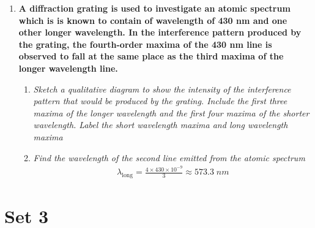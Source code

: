 \documentclass{report}
\begin{document}
\begin{enumerate}
			\item \textbf{A diffraction grating is used to investigate an atomic spectrum which is is known to contain of wavelength of 430 nm and one other longer wavelength. In the interference pattern produced by the grating, the fourth-order maxima of the 430 nm line is observed to fall at the same place as the third maxima of the longer wavelength line.}

				\begin{enumerate}
					\item \textit{Sketch a qualitative diagram to show the intensity of the interference pattern that would be produced by the grating. Include the first three maxima of the longer wavelength and the first four maxima of the shorter wavelength. Label the short wavelength maxima and long wavelength maxima}

					\item \textit{Find the wavelength of the second line emitted from the atomic spectrum}
						\begin{align*}
							\lambda_\text{long} = \frac{4 \times 430 \times 10^{-9}}{3} \approx 573.3 \; nm
						\end{align*}
				\end{enumerate}

		\end{enumerate}


	\section{Set 3}
\end{document}

